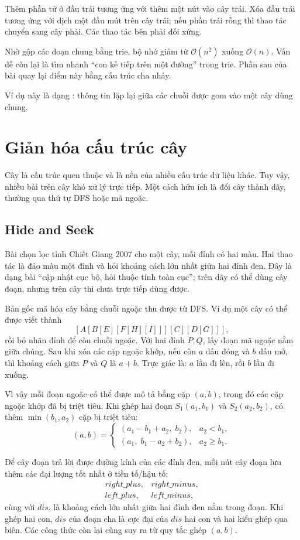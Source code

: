 \documentclass[11pt]{article}
\newcommand{\Oh}{\mathcal{O}}
\begin{document}
Thêm phần tử ở đầu trái tương ứng với thêm một nút vào cây trái. Xóa đầu trái
tương ứng với dịch một đầu mút trên cây trái; nếu phần trái rỗng thì thao tác
chuyển sang cây phải. Các thao tác bên phải đối xứng.

Nhờ gộp các đoạn chung bằng trie, bộ nhớ giảm từ \(\Oh(n^2)\) xuống
\(\Oh(n)\). Vấn đề còn lại là tìm nhanh ``con kế tiếp trên một đường'' trong
trie. Phần sau của bài quay lại điểm này bằng cấu trúc cha nhảy.

Ví dụ này là dạng : thông tin lặp lại giữa các chuỗi được gom
vào một cây dùng chung.

\section{Giản hóa cấu trúc cây}

Cây là cấu trúc quen thuộc và là nền của nhiều cấu trúc dữ liệu khác. Tuy vậy,
nhiều bài trên cây khó xử lý trực tiếp. Một cách hữu ích là đổi cây thành dãy,
thường qua thứ tự DFS hoặc mã ngoặc.

\subsection{Hide and Seek}

Bài chọn lọc tỉnh Chiết Giang 2007 cho một cây, mỗi đỉnh có hai màu. Hai thao
tác là đảo màu một đỉnh và hỏi khoảng cách lớn nhất giữa hai đỉnh đen. Đây là
dạng bài ``cập nhật cục bộ, hỏi thuộc tính toàn cục''; trên dãy có thể dùng
cây đoạn, nhưng trên cây thì chưa trực tiếp dùng được.

Bản gốc mã hóa cây bằng chuỗi ngoặc thu được từ DFS. Ví dụ một cây có thể được
viết thành
\[
  [A[B[E][F[H][I]]][C][D[G]]],
\]
rồi bỏ nhãn đỉnh để còn chuỗi ngoặc. Với hai đỉnh \(P,Q\), lấy đoạn mã ngoặc
nằm giữa chúng. Sau khi xóa các cặp ngoặc khớp, nếu còn \(a\) dấu đóng và
\(b\) dấu mở, thì khoảng cách giữa \(P\) và \(Q\) là \(a+b\). Trực giác là:
\(a\) lần đi lên, rồi \(b\) lần đi xuống.

Vì vậy mỗi đoạn ngoặc có thể được mô tả bằng cặp \((a,b)\), trong đó các cặp
ngoặc khớp đã bị triệt tiêu. Khi ghép hai đoạn \(S_1(a_1,b_1)\) và
\(S_2(a_2,b_2)\), có thêm \(\min(b_1,a_2)\) cặp bị triệt tiêu:
\[
(a,b)=
\begin{cases}
(a_1-b_1+a_2,\; b_2), & a_2<b_1,\\
(a_1,\; b_1-a_2+b_2), & a_2\ge b_1.
\end{cases}
\]

Để cây đoạn trả lời được đường kính của các đỉnh đen, mỗi nút cây đoạn lưu
thêm các đại lượng tốt nhất ở tiền tố/hậu tố:
\[
\begin{array}{ll}
right\_plus, & right\_minus,\\
left\_plus, & left\_minus,
\end{array}
\]
cùng với \(dis\), là khoảng cách lớn nhất giữa hai đỉnh đen nằm trong đoạn.
Khi ghép hai con, \(dis\) của đoạn cha là cực đại của \(dis\) hai con và hai
kiểu ghép qua biên. Các công thức còn lại cũng suy ra từ quy tắc ghép
\((a,b)\).
\end{document}
